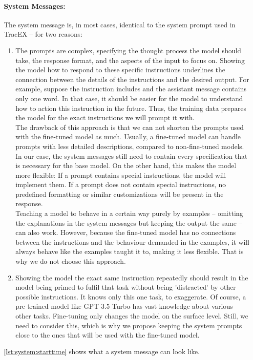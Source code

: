\paragraph{System Messages:} The system message is, in most cases, identical to the system prompt used in TracEX – for two reasons:
\begin{enumerate}
    \item
        The prompts are complex, specifying the thought process the model should take, the response format, and the aspects of the input to focus on. Showing the model how to respond to these specific instructions underlines the connection between the details of the instructions and the desired output. For example, suppose the instruction includes  and the assistant message contains only one word. In that case, it should be easier for the model to understand how to action this instruction in the future. Thus, the training data prepares the model for the exact instructions we will prompt it with.\\
        The drawback of this approach is that we can not shorten the prompts used with the fine-tuned model as much. Usually, a fine-tuned model can handle prompts with less detailed descriptions, compared to non-fine-tuned models. In our case, the system messages still need to contain every specification that is necessary for the base model. On the other hand, this makes the model more flexible: If a prompt contains special instructions, the model will implement them. If a prompt does not contain special instructions, no predefined formatting or similar customizations will be present in the response.\\
        Teaching a model to behave in a certain way purely by examples – omitting the explanations in the system messages but keeping the output the same – can also work. However, because the fine-tuned model has no connections between the instructions and the behaviour demanded in the examples, it will always behave like the examples taught it to, making it less flexible. That is why we do not choose this approach.
    \item 
        Showing the model the exact same instruction repeatedly should result in the model being primed to fulfil that task without being 'distracted' by other possible instructions. It knows only this one task, to exaggerate. Of course, a pre-trained model like GPT-3.5 Turbo has vast knowledge about various other tasks. Fine-tuning only changes the model on the surface level. Still, we need to consider this, which is why we propose keeping the system prompts close to the ones that will be used with the fine-tuned model.
\end{enumerate}
\autoref{lst:system:starttime} shows what a system message can look like.

